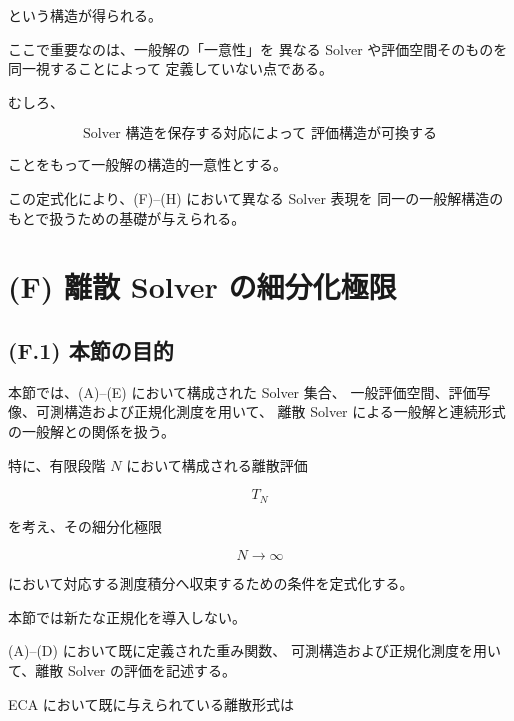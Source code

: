 \documentclass[a4paper,11pt]{article}
\begin{document}
という構造が得られる。

ここで重要なのは、一般解の「一意性」を
異なる Solver や評価空間そのものを同一視することによって
定義していない点である。

むしろ、

\begin{equation}
    \boxed{
        \text{Solver 構造を保存する対応によって
        評価構造が可換する}
    }
\end{equation}

ことをもって一般解の構造的一意性とする。

この定式化により、(F)--(H) において異なる Solver 表現を
同一の一般解構造のもとで扱うための基礎が与えられる。


\section{(F) 離散 Solver の細分化極限}
\label{sec:F-discrete-limit}

\subsection{(F.1) 本節の目的}
\label{subsec:F1}

本節では、(A)--(E) において構成された Solver 集合、
一般評価空間、評価写像、可測構造および正規化測度を用いて、
離散 Solver による一般解と連続形式の一般解との関係を扱う。

特に、有限段階 $N$ において構成される離散評価

\begin{equation}
    T_N
\end{equation}

を考え、その細分化極限

\begin{equation}
    N\to\infty
\end{equation}

において対応する測度積分へ収束するための条件を定式化する。

本節では新たな正規化を導入しない。

(A)--(D) において既に定義された重み関数、
可測構造および正規化測度を用いて、離散 Solver の評価を記述する。

ECA において既に与えられている離散形式は
\end{document}
